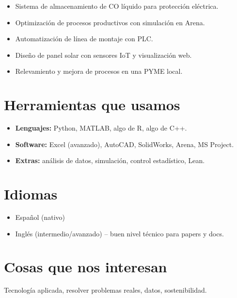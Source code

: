 \documentclass[a4paper,11pt]{article}
\begin{document}
\begin{itemize}[leftmargin=*]
  \item Sistema de almacenamiento de CO líquido para protección eléctrica.
  \item Optimización de procesos productivos con simulación en Arena.
  \item Automatización de línea de montaje con PLC.
  \item Diseño de panel solar con sensores IoT y visualización web.
  \item Relevamiento y mejora de procesos en una PYME local.
\end{itemize}

\section*{Herramientas que usamos}

\begin{itemize}[leftmargin=*]
  \item \textbf{Lenguajes:} Python, MATLAB, algo de R, algo de C++.
  \item \textbf{Software:} Excel (avanzado), AutoCAD, SolidWorks, Arena, MS Project.
  \item \textbf{Extras:} análisis de datos, simulación, control estadístico, Lean.
\end{itemize}

\section*{Idiomas}
\begin{itemize}[leftmargin=*]
  \item Español (nativo)
  \item Inglés (intermedio/avanzado) – buen nivel técnico para papers y docs.
\end{itemize}

\section*{Cosas que nos interesan}
Tecnología aplicada, resolver problemas reales, datos, sostenibilidad.
\end{document}
